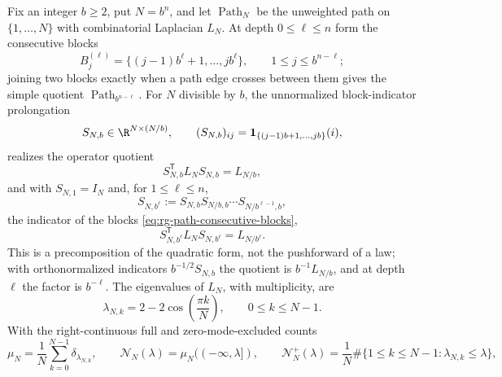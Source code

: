 Fix an integer \(b\geq2\), put \(N=b^n\), and let \(\operatorname{Path}_N\) be the
unweighted path on \(\{1,\ldots,N\}\) with combinatorial Laplacian \(L_N\). At
depth \(0\leq\ell\leq n\) form the consecutive blocks
\begin{equation}
B_j^{(\ell)}=\{(j-1)b^\ell+1,\ldots,jb^\ell\},
\qquad1\leq j\leq b^{n-\ell};
\label{eq:rg-path-consecutive-blocks}
\end{equation}
joining two blocks exactly when a path edge crosses between them gives the
simple quotient \(\operatorname{Path}_{b^{n-\ell}}\). For \(N\) divisible by
\(b\), the unnormalized block-indicator prolongation
\begin{equation}
S_{N,b}\in\R^{N\times(N/b)},
\qquad
(S_{N,b})_{ij}=\mathbf1_{\{(j-1)b+1,\ldots,jb\}}(i),
\label{eq:rg-path-block-indicator}
\end{equation}
realizes the operator quotient
\begin{equation}
S_{N,b}^{\mathsf T}L_NS_{N,b}=L_{N/b},
\label{eq:rg-path-galerkin-quotient}
\end{equation}
and with \(S_{N,1}=I_N\) and, for \(1\leq\ell\leq n\),
\begin{equation}
S_{N,b^\ell}:=S_{N,b}S_{N/b,b}\cdots S_{N/b^{\ell-1},b},
\label{eq:rg-path-depth-block-indicator}
\end{equation}
the indicator of the blocks \eqref{eq:rg-path-consecutive-blocks},
\begin{equation}
S_{N,b^\ell}^{\mathsf T}L_NS_{N,b^\ell}=L_{N/b^\ell}.
\label{eq:rg-path-depth-galerkin-quotient}
\end{equation}
This is a precomposition of the quadratic form, not the pushforward of a law;
with orthonormalized indicators \(b^{-1/2}S_{N,b}\) the quotient is
\(b^{-1}L_{N/b}\), and at depth \(\ell\) the factor is \(b^{-\ell}\). The
eigenvalues of \(L_N\), with multiplicity, are
\begin{equation}
\lambda_{N,k}=2-2\cos\left(\frac{\pi k}{N}\right),
\qquad0\leq k\leq N-1.
\label{eq:rg-path-laplacian-eigenvalues}
\end{equation}
With the right-continuous full and zero-mode-excluded counts
\begin{equation}
\mu_N=\frac1N\sum_{k=0}^{N-1}\delta_{\lambda_{N,k}},
\qquad
\mathcal N_N(\lambda)=\mu_N((-\infty,\lambda]),
\qquad
\mathcal N^+_N(\lambda)=\frac1N
\#\{1\leq k\leq N-1:\lambda_{N,k}\leq\lambda\},
\label{eq:rg-path-spectral-counts}
\end{equation}
